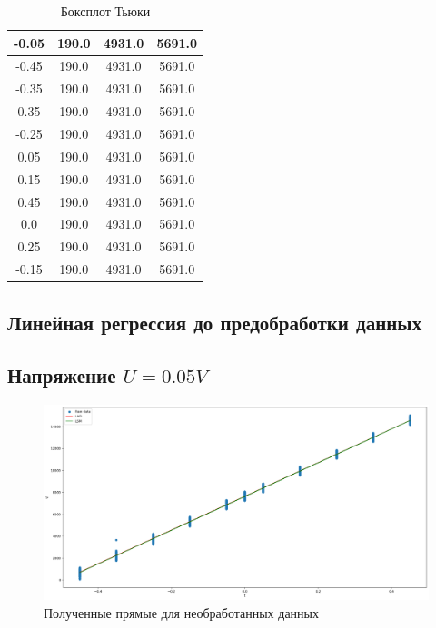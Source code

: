 \documentclass[12pt,a4paper]{article}
\begin{document}
\begin{table}[htbp]
    \centering
    \begin{tabular}{ |c|c|c|c| }
        \hline
        -0.05 & 190.0 & 4931.0 & 5691.0 \\
        \hline
        -0.45 & 190.0 & 4931.0 & 5691.0 \\
        \hline
        -0.35 & 190.0 & 4931.0 & 5691.0 \\
        \hline
        0.35 & 190.0 & 4931.0 & 5691.0 \\
        \hline
        -0.25 & 190.0 & 4931.0 & 5691.0 \\
        \hline
        0.05 & 190.0 & 4931.0 & 5691.0 \\
        \hline
        0.15 & 190.0 & 4931.0 & 5691.0 \\
        \hline
        0.45 & 190.0 & 4931.0 & 5691.0 \\
        \hline
        0.0 & 190.0 & 4931.0 & 5691.0 \\
        \hline
        0.25 & 190.0 & 4931.0 & 5691.0 \\
        \hline
        -0.15 & 190.0 & 4931.0 & 5691.0 \\
        \hline
    \end{tabular}
    \caption{Боксплот Тьюки}
\end{table}

\subsection{Линейная регрессия до предобработки данных}
\subsection{Напряжение $U = 0.05V$}
\begin{figure}[htbp!]
    \begin{center}
        \includegraphics[width = 1\linewidth]{unfiltered.png}
        \caption{Полученные прямые для необработанных данных}
    \end{center}
\end{figure}
\end{document}

